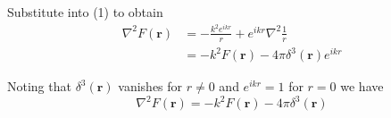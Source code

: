 Substitute into (1) to obtain
\begin{align*}
\nabla^2F(\mathbf r)&=-\frac{k^2e^{ikr}}{r}+e^{ikr}\nabla^2\frac{1}{r}
\\
&=-k^2F(\mathbf r)-4\pi\delta^3(\mathbf r)e^{ikr}
\end{align*}

Noting that $\delta^3(\mathbf r)$ vanishes for $r\ne0$ and $e^{ikr}=1$ for $r=0$ we have
\begin{equation*}
\nabla^2F(\mathbf r)=-k^2F(\mathbf r)-4\pi\delta^3(\mathbf r)\tag{4}
\end{equation*}


